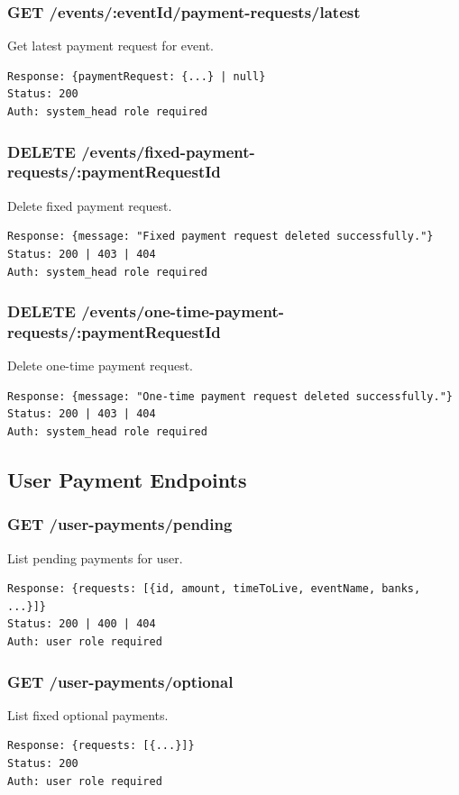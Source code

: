 \documentclass[12pt,a4paper]{article}
\begin{document}
\subsubsection{GET /events/:eventId/payment-requests/latest}
Get latest payment request for event.
\begin{lstlisting}
Response: {paymentRequest: {...} | null}
Status: 200
Auth: system_head role required
\end{lstlisting}

\subsubsection{DELETE /events/fixed-payment-requests/:paymentRequestId}
Delete fixed payment request.
\begin{lstlisting}
Response: {message: "Fixed payment request deleted successfully."}
Status: 200 | 403 | 404
Auth: system_head role required
\end{lstlisting}

\subsubsection{DELETE /events/one-time-payment-requests/:paymentRequestId}
Delete one-time payment request.
\begin{lstlisting}
Response: {message: "One-time payment request deleted successfully."}
Status: 200 | 403 | 404
Auth: system_head role required
\end{lstlisting}

\subsection{User Payment Endpoints}

\subsubsection{GET /user-payments/pending}
List pending payments for user.
\begin{lstlisting}
Response: {requests: [{id, amount, timeToLive, eventName, banks, ...}]}
Status: 200 | 400 | 404
Auth: user role required
\end{lstlisting}

\subsubsection{GET /user-payments/optional}
List fixed optional payments.
\begin{lstlisting}
Response: {requests: [{...}]}
Status: 200
Auth: user role required
\end{lstlisting}
\end{document}
